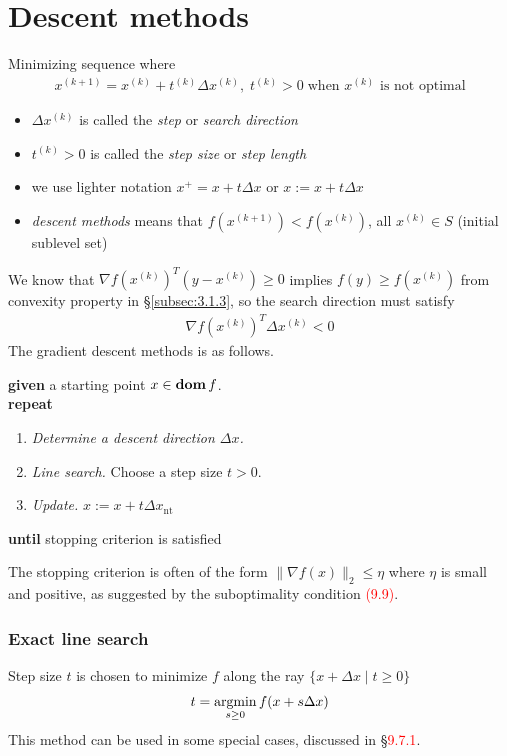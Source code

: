 \section{Descent methods}
Minimizing sequence where
\begin{align*}
  x^{(k+1)}=x^{(k)}+t^{(k)}\Delta x^{(k)},\;t^{(k)}>0\;\text{when $x^{(k)}$ is not optimal}
\end{align*}
\begin{itemize}
  \item $\Delta x^{(k)}$ is called the \textit{step} or \textit{search direction}
  \item $t^{(k)}>0$ is called the \textit{step size} or \textit{step length}
  \item we use lighter notation $x^+=x+t\Delta x$ or $x:=x+t\Delta x$
  \item \textit{descent methods} means that $f(x^{(k+1)})<f(x^{(k)})$, \ie all $x^{(k)}\in S$ (initial sublevel set)
\end{itemize}
We know that $\nabla f(x^{(k)})^T(y-x^{(k)})\ge 0$ implies $f(y)\ge f(x^{(k)})$ from convexity property in \S\ref{subsec:3.1.3}, so the search direction must satisfy
\begin{align*}
  \nabla f(x^{(k)})^T\Delta x^{(k)}<0
\end{align*}
The gradient descent methods is as follows.
\begin{algorithm}
  $ $\\
  \textbf{given} a starting point $x\in\mathop{\bf dom} f$.\\
  \textbf{repeat}
  \begin{enumerate}
    \item \textit{Determine a descent direction $\Delta x$.}
    \item \textit{Line search.} Choose a step size $t>0$.
    \item \textit{Update.} $x:=x+t\Delta x_{\text{nt}}$
  \end{enumerate}
  \textbf{until} stopping criterion is satisfied
\end{algorithm}
The stopping criterion is often of the form $\|\nabla f(x)\|_2\le\eta$ where $\eta$ is small and positive, as suggested by the suboptimality condition \textcolor{red}{(9.9)}.

\subsubsection{Exact line search}
Step size $t$ is chosen to minimize $f$ along the ray $\{x+\Delta x\mid t\ge 0\}$
\begin{align}
  t=\mathop{\rm argmin}_{s\ge 0}f(x+s\Delta x)\label{eq:9.16}
\end{align}
This method can be used in some special cases, discussed in \S\textcolor{red}{9.7.1}.

